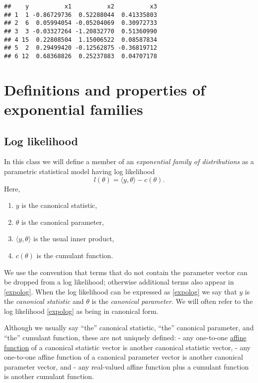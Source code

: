 \documentclass[
]{article}
\begin{document}
\begin{verbatim}
##    y          x1          x2          x3
## 1  1 -0.86729736  0.52288044  0.41335803
## 2  6  0.05994054 -0.05204069  0.30972733
## 3  3 -0.03327264 -1.20832770  0.51360990
## 4 15  0.22808504  1.15006522  0.08587834
## 5  2  0.29499420 -0.12562875 -0.36819712
## 6 12  0.68368826  0.25237883  0.04707178
\end{verbatim}

\hypertarget{definitions-and-properties-of-exponential-families}{%
\section{Definitions and properties of exponential
families}\label{definitions-and-properties-of-exponential-families}}

\hypertarget{log-likelihood}{%
\subsection{Log likelihood}\label{log-likelihood}}

In this class we will define a member of an
\emph{exponential family of distributions} as a parametric statistical
model having log likelihood \begin{equation} \label{expolog}
    l(\theta) = \langle y, \theta \rangle - c(\theta).
\end{equation} Here,

\begin{enumerate}
  \item[] $y$ is the canonical statistic, 
  \item[] $\theta$ is the canonical parameter, 
    \item[] $\langle y,\theta \rangle$ is the usual inner product,
    \item[] $c(\theta)$ is the cumulant function.
\end{enumerate}

We use the convention that terms that do not contain the parameter
vector can be dropped from a log likelihood; otherwise additional terms
also appear in \eqref{expolog}. When the log likelihood can be expressed
as \eqref{expolog} we say that \(y\) is the \emph{canonical statistic}
and \(\theta\) is the \emph{canonical parameter}. We will often refer to
the log likelihood \eqref{expolog} as being in canonical form.

Although we usually say ``the'' canonical statistic, ``the'' canonical
parameter, and ``the'' cumulant function, these are not uniquely
defined: - any one-to-one
\href{https://mathworld.wolfram.com/AffineFunction.html}{affine
function} of a canonical statistic vector is another canonical statistic
vector, - any one-to-one affine function of a canonical parameter vector
is another canonical parameter vector, and - any real-valued affine
function plus a cumulant function is another cumulant function.
\end{document}
